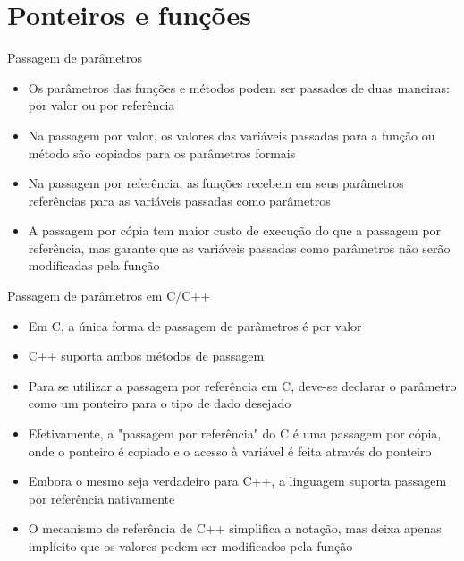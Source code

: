 \section{Ponteiros e funções}

\begin{frame}[fragile]{Passagem de parâmetros}

	\begin{itemize}
	
		\item Os parâmetros das funções e métodos podem ser passados de duas maneiras: 
        por valor ou por referência

		\item Na passagem por valor, os valores das variáveis passadas para a função ou método são 
        copiados para os parâmetros formais

		\item Na passagem por referência, as funções recebem em seus parâmetros referências para 
        as variáveis passadas como parâmetros

        \item A passagem por cópia tem maior custo de execução do que a passagem por referência,
        mas garante que as variáveis passadas como parâmetros não serão modificadas pela
        função
	\end{itemize} 
 
\end{frame}
 
\begin{frame}[fragile]{Passagem de parâmetros em C/C++}

	\begin{itemize}
		\item Em C, a única forma de passagem de parâmetros é por valor 
    
        \item C++ suporta ambos métodos de passagem

		\item Para se utilizar a passagem por referência em C, deve-se declarar o parâmetro como um 
        ponteiro para o tipo de dado desejado

        \item Efetivamente, a "passagem por referência" do C é uma passagem por cópia, onde o
        ponteiro é copiado e o acesso à variável é feita através do ponteiro

		\item Embora o mesmo seja verdadeiro para C++, a linguagem suporta passagem por referência 
        nativamente

		\item O mecanismo de referência de C++ simplifica a notação, mas deixa apenas implícito 
        que os valores podem ser modificados pela função
	\end{itemize}

\end{frame}

